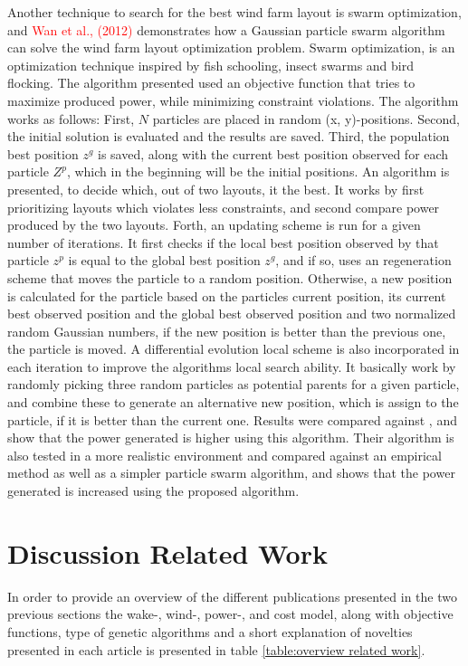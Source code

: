 \noindent Another technique to search for the best wind farm layout is swarm optimization, and \textcolor{red}{Wan et al., (2012)} demonstrates how a Gaussian particle swarm algorithm can solve the wind farm layout optimization problem. Swarm optimization, is an optimization technique inspired by fish schooling, insect swarms and bird flocking. The algorithm presented used an objective function that tries to maximize produced power, while minimizing constraint violations. The algorithm works as follows: First, $N$ particles are placed in random (x, y)-positions. Second, the initial solution is evaluated and the results are saved. Third, the population best position $z^g$ is saved, along with the current best position observed for each particle $Z^p$, which in the beginning will be the initial positions. An algorithm is presented, to decide which, out of two layouts, it the best. It works by first prioritizing layouts which violates less constraints, and second compare power produced by the two layouts. Forth, an updating scheme is run for a given number of iterations. It first checks if the local best position observed by that particle $z^p$ is equal to the global best position $z^g$, and if so, uses an regeneration scheme that moves the particle to a random position. Otherwise, a new position is calculated for the particle based on the particles current position, its current best observed position and the global best observed position and two normalized random Gaussian numbers, if the new position is better than the previous one, the particle is moved. A differential evolution local scheme is also incorporated in each iteration to improve the algorithms local search ability. It basically work by randomly picking three random particles as potential parents for a given particle, and combine these to generate an alternative new position, which is assign to the particle, if it is better than the current one. Results were compared against \citep{Grady}, and show that the power generated is higher using this algorithm. Their algorithm is also tested in a more realistic environment and compared against an empirical method as well as a simpler particle swarm algorithm, and shows that the power generated is increased using the proposed algorithm.\\


\section{Discussion Related Work}
In order to provide an overview of the different publications presented in the two previous sections the wake-, wind-, power-, and cost model, along with objective functions, type of genetic algorithms and a short explanation of novelties presented in each article is presented in table \ref{table:overview related work}. \\

